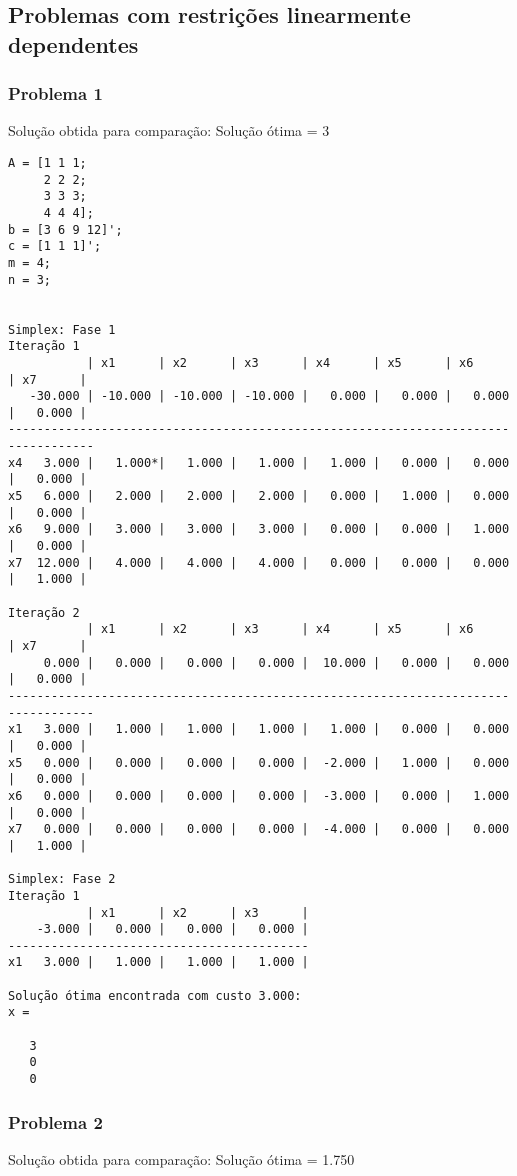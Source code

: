 \documentclass[brazil,times]{abnt}
\begin{document}
\subsection*{Problemas com restrições linearmente dependentes}
\subsubsection*{Problema 1}
Solução obtida para comparação: Solução ótima = 3

{\scriptsize \begin{verbatim}
A = [1 1 1;
	 2 2 2;
	 3 3 3;
	 4 4 4];
b = [3 6 9 12]';
c = [1 1 1]';
m = 4;
n = 3;


Simplex: Fase 1
Iteração 1
           | x1      | x2      | x3      | x4      | x5      | x6      | x7      |
   -30.000 | -10.000 | -10.000 | -10.000 |   0.000 |   0.000 |   0.000 |   0.000 |
----------------------------------------------------------------------------------
x4   3.000 |   1.000*|   1.000 |   1.000 |   1.000 |   0.000 |   0.000 |   0.000 |
x5   6.000 |   2.000 |   2.000 |   2.000 |   0.000 |   1.000 |   0.000 |   0.000 |
x6   9.000 |   3.000 |   3.000 |   3.000 |   0.000 |   0.000 |   1.000 |   0.000 |
x7  12.000 |   4.000 |   4.000 |   4.000 |   0.000 |   0.000 |   0.000 |   1.000 |

Iteração 2
           | x1      | x2      | x3      | x4      | x5      | x6      | x7      |
     0.000 |   0.000 |   0.000 |   0.000 |  10.000 |   0.000 |   0.000 |   0.000 |
----------------------------------------------------------------------------------
x1   3.000 |   1.000 |   1.000 |   1.000 |   1.000 |   0.000 |   0.000 |   0.000 |
x5   0.000 |   0.000 |   0.000 |   0.000 |  -2.000 |   1.000 |   0.000 |   0.000 |
x6   0.000 |   0.000 |   0.000 |   0.000 |  -3.000 |   0.000 |   1.000 |   0.000 |
x7   0.000 |   0.000 |   0.000 |   0.000 |  -4.000 |   0.000 |   0.000 |   1.000 |

Simplex: Fase 2
Iteração 1
           | x1      | x2      | x3      |
    -3.000 |   0.000 |   0.000 |   0.000 |
------------------------------------------
x1   3.000 |   1.000 |   1.000 |   1.000 |

Solução ótima encontrada com custo 3.000:
x =

   3
   0
   0
\end{verbatim} }


\subsubsection*{Problema 2}
Solução obtida para comparação: Solução ótima = 1.750
\end{document}
